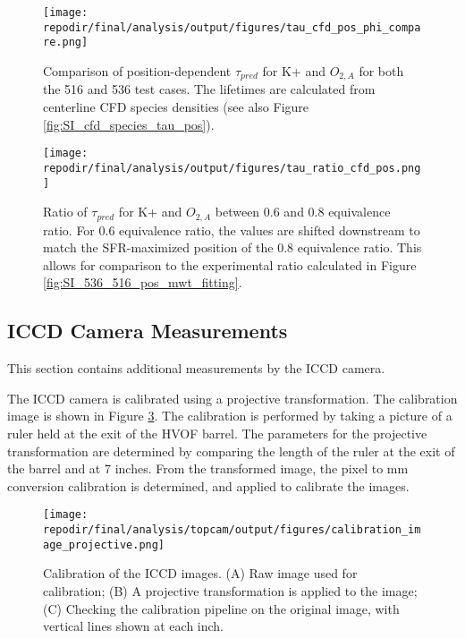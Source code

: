 
\begin{figure}[]
\centering
\texttt{[image: \\repodir/final/analysis/output/figures/tau\_cfd\_pos\_phi\_compare.png]}
\caption{Comparison of position-dependent $\tau_{pred}$ for K+ and $O_{2,A}$ for both the 516 and 536 test cases. The lifetimes are calculated from centerline CFD species densities (see also Figure \ref{fig:SI_cfd_species_tau_pos}).}
\label{fig:SI_tau_cfd_pos_phi_compare}
\end{figure}



\begin{figure}[]
\centering
\texttt{[image: \\repodir/final/analysis/output/figures/tau\_ratio\_cfd\_pos.png]}
\caption{Ratio of $\tau_{pred}$ for K+ and $O_{2,A}$ between 0.6 and 0.8 equivalence ratio. For 0.6 equivalence ratio, the values are shifted downstream to match the SFR-maximized position of the 0.8 equivalence ratio. This allows for comparison to the experimental ratio calculated in Figure \ref{fig:SI_536_516_pos_mwt_fitting}.}
\label{fig:SI_tau_ratio_cfd_pos}
\end{figure}

\clearpage
\subsection{ICCD Camera Measurements}

This section contains additional measurements by the ICCD camera. 

The ICCD camera is calibrated using a projective transformation. The calibration image is shown in Figure \ref{fig:SI_iccd_calibration}. The calibration is performed by taking a picture of a ruler held at the exit of the HVOF barrel. The parameters for the projective transformation are determined by comparing the length of the ruler at the exit of the barrel and at 7 inches. From the transformed image, the pixel to mm conversion calibration is determined, and applied to calibrate the images. 

\begin{figure}[]
\centering
\texttt{[image: \\repodir/final/analysis/topcam/output/figures/calibration\_image\_projective.png]}
\caption{Calibration of the ICCD images. (A) Raw image used for calibration; (B) A projective transformation is applied to the image; (C) Checking the calibration pipeline on the original image, with vertical lines shown at each inch.}
\label{fig:SI_iccd_calibration}
\end{figure}

